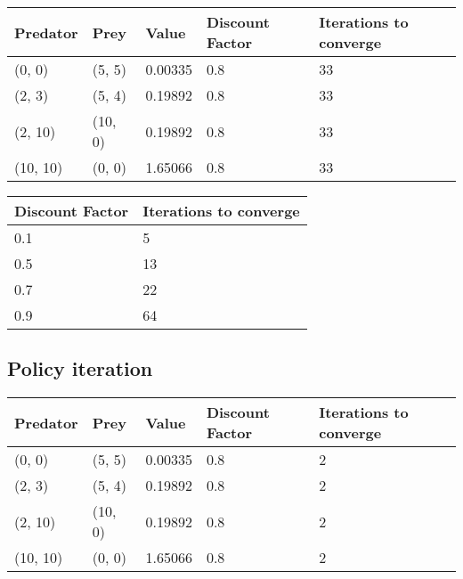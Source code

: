 \documentclass{article}
\begin{document}
\begin{center}
	\begin{tabular}{ l | l | l | l | l }
		Predator & Prey & Value & Discount Factor & Iterations to converge \\ 
		\hline
		(0, 0) & (5, 5) & 0.00335 & 0.8 & 33 \\
		(2, 3) & (5, 4) & 0.19892 & 0.8 & 33 \\
		(2, 10) & (10, 0) & 0.19892 & 0.8 & 33 \\
		(10, 10) & (0, 0) & 1.65066 & 0.8 & 33 \\	
	\end{tabular}
\end{center}



\begin{center}
	\begin{tabular}{ l || l }
		Discount Factor & Iterations to converge \\ 
		\hline
		0.1 & 5 \\
		0.5 & 13 \\
		0.7 & 22 \\
		0.9 & 64 \\	
	\end{tabular}
\end{center}



\subsection*{Policy iteration}



\begin{center}
	\begin{tabular}{ l | l | l | l | l }
		Predator & Prey & Value & Discount Factor & Iterations to converge \\ 
		\hline
		(0, 0) & (5, 5) & 0.00335 & 0.8 & 2 \\
		(2, 3) & (5, 4) & 0.19892 & 0.8 & 2 \\
		(2, 10) & (10, 0) & 0.19892 & 0.8 & 2 \\
		(10, 10) & (0, 0) & 1.65066 & 0.8 & 2 \\	
	\end{tabular}
\end{center}
\end{document}
